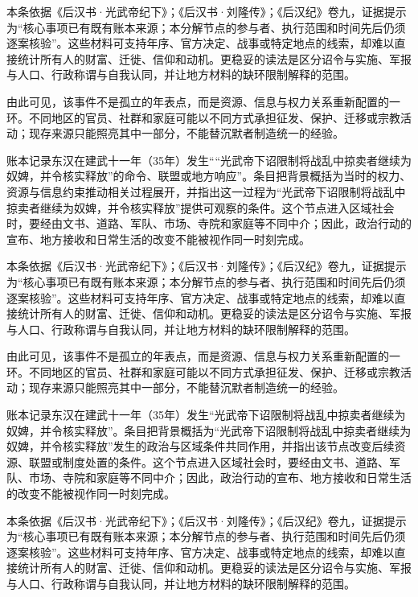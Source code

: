 本条依据《后汉书·光武帝纪下》；《后汉书·刘隆传》；《后汉纪》卷九，证据提示为“核心事项已有既有账本来源；本分解节点的参与者、执行范围和时间先后仍须逐案核验”。这些材料可支持年序、官方决定、战事或特定地点的线索，却难以直接统计所有人的财富、迁徙、信仰和动机。更稳妥的读法是区分诏令与实施、军报与人口、行政称谓与自我认同，并让地方材料的缺环限制解释的范围。

由此可见，该事件不是孤立的年表点，而是资源、信息与权力关系重新配置的一环。不同地区的官员、社群和家庭可能以不同方式承担征发、保护、迁移或宗教活动；现存来源只能照亮其中一部分，不能替沉默者制造统一的经验。

账本记录东汉在建武十一年（35年）发生““光武帝下诏限制将战乱中掠卖者继续为奴婢，并令核实释放”的命令、联盟或地方响应”。条目把背景概括为当时的权力、资源与信息约束推动相关过程展开，并指出这一过程为“光武帝下诏限制将战乱中掠卖者继续为奴婢，并令核实释放”提供可观察的条件。这个节点进入区域社会时，要经由文书、道路、军队、市场、寺院和家庭等不同中介；因此，政治行动的宣布、地方接收和日常生活的改变不能被视作同一时刻完成。

本条依据《后汉书·光武帝纪下》；《后汉书·刘隆传》；《后汉纪》卷九，证据提示为“核心事项已有既有账本来源；本分解节点的参与者、执行范围和时间先后仍须逐案核验”。这些材料可支持年序、官方决定、战事或特定地点的线索，却难以直接统计所有人的财富、迁徙、信仰和动机。更稳妥的读法是区分诏令与实施、军报与人口、行政称谓与自我认同，并让地方材料的缺环限制解释的范围。

由此可见，该事件不是孤立的年表点，而是资源、信息与权力关系重新配置的一环。不同地区的官员、社群和家庭可能以不同方式承担征发、保护、迁移或宗教活动；现存来源只能照亮其中一部分，不能替沉默者制造统一的经验。

账本记录东汉在建武十一年（35年）发生“光武帝下诏限制将战乱中掠卖者继续为奴婢，并令核实释放”。条目把背景概括为“光武帝下诏限制将战乱中掠卖者继续为奴婢，并令核实释放”发生的政治与区域条件共同作用，并指出该节点改变后续资源、联盟或制度处置的条件。这个节点进入区域社会时，要经由文书、道路、军队、市场、寺院和家庭等不同中介；因此，政治行动的宣布、地方接收和日常生活的改变不能被视作同一时刻完成。

本条依据《后汉书·光武帝纪下》；《后汉书·刘隆传》；《后汉纪》卷九，证据提示为“核心事项已有既有账本来源；本分解节点的参与者、执行范围和时间先后仍须逐案核验”。这些材料可支持年序、官方决定、战事或特定地点的线索，却难以直接统计所有人的财富、迁徙、信仰和动机。更稳妥的读法是区分诏令与实施、军报与人口、行政称谓与自我认同，并让地方材料的缺环限制解释的范围。

